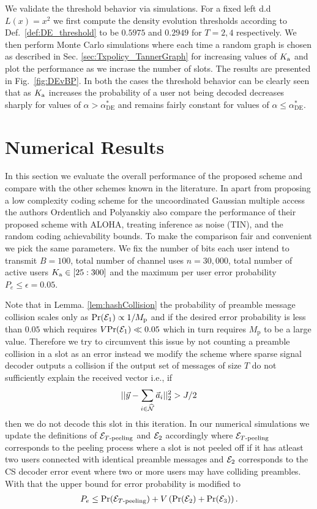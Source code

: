 We validate the threshold behavior via simulations.  For a fixed left d.d $L(x)=x^2$ we first compute the density evolution thresholds according to Def.~\ref{def:DE_threshold} to be $0.5975$ and $0.2949$ for $T=2,4$ respectively. We then perform Monte Carlo simulations where each time a random graph is chosen as described in Sec. \ref{sec:Txpolicy_TannerGraph} for increasing values of $K_{\text{a}}$ and plot the performance as we incrase the number of slots. The results are presented in Fig.~\ref{fig:DEvBP}. In both the cases the threshold behavior can be clearly seen that as $K_{\text{a}}$ increases the probability of a user not being decoded decreases sharply for values of $\alpha>\alpha_{\text{DE}}^*$ and remains fairly constant for values of $\alpha\leq\alpha_{\text{DE}}^*$.

\section{Numerical Results}
In this section we evaluate the overall performance of the proposed scheme and compare with the other schemes known in the literature. In \cite{ordentlich2017low} apart from proposing a low complexity coding scheme for the uncoordinated Gaussian multiple access the authors Ordentlich and Polyanskiy also compare the performance of their proposed scheme with ALOHA, treating inference as noise (TIN), and the random coding achievability bounds. To make the comparison fair and convenient we pick the same parameters. We fix the number of bits each user intend to transmit $B=100$,  total number of channel uses $n=30,000$, total number of active users $K_{\text{a}}\in [25:300]$ and the maximum per user error probability $P_e\leq \epsilon=0.05$.

\begin{remark}
Note that in Lemma. \ref{lem:hashCollision} the probability of preamble message collision scales only as $\mathrm{Pr}(\mathcal{E}_1)\propto 1/M_\mathrm{p}$ and if the desired error probability is less than $0.05$ which requires $V\mathrm{Pr}(\mathcal{E}_1)\ll 0.05$ which in turn requires $M_\mathrm{p}$ to be a large value. Therefore we try to circumvent this issue by not counting a preamble collision in a slot as an error instead we modify the scheme where sparse signal decoder outputs a collision if the output set of messages of size $T$ do not sufficiently explain the received vector i.e., if
\[
||\vec{y}-\sum_{i\in\widehat{\mathcal{N}}}\vec{a}_i||_2^2 >J/2
\]
then we do not decode this slot in this iteration. In our numerical simulations we update the definitions of $\mathcal{E}_{T\text{-peeling}}$ and $\mathcal{E}_2$ accordingly where $\mathcal{E}_{T\text{-peeling}}$ corresponds to the peeling process where a slot is not peeled off if it has atleast two users connected with identical preamble messages and $\mathcal{E}_2$  corresponds to the CS decoder error event where two or more users may have colliding preambles. With that the upper bound for error probability is modified to
\begin{align}
P_e\leq \mathrm{Pr}(\mathcal{E}_{T\text{-peeling}})+V\left(\mathrm{Pr}(\mathcal{E}_2)+\mathrm{Pr}(\mathcal{E}_3)\right).
\label{eqn:errPrb_split_modified}
\end{align}
\end{remark}

